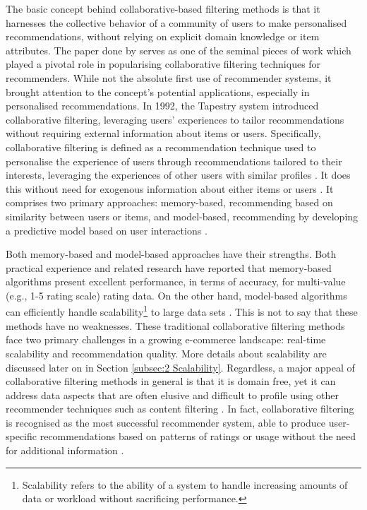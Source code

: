The basic concept behind collaborative-based filtering methods is that it harnesses the collective behavior of a community of users to make personalised recommendations, without relying on explicit domain knowledge or item attributes. The paper done by \cite{resnick1994grouplens} serves as one of the seminal pieces of work which played a pivotal role in popularising collaborative filtering techniques for recommenders. While not the absolute first use of recommender systems, it brought attention to the concept's potential applications, especially in personalised recommendations. In 1992, the Tapestry system \cite{goldberg1992using} introduced collaborative filtering, leveraging users' experiences to tailor recommendations without requiring external information about items or users. Specifically, collaborative filtering is defined as a recommendation technique used to personalise the experience of users through recommendations tailored to their interests, leveraging the experiences of other users with similar profiles \cite{herlocker1999algorithmic}. It does this without need for exogenous information about either items or users \cite{shapira2022recommender}. It comprises two primary approaches: memory-based, recommending based on similarity between users or items, and model-based, recommending by developing a predictive model based on user interactions \cite{symeonidis2008collaborative}. 

Both memory-based and model-based approaches have their strengths. Both practical experience and related research have reported that memory-based algorithms present excellent performance, in terms of accuracy, for multi-value (e.g., 1-5 rating scale) rating data. On the other hand, model-based algorithms can efficiently handle scalability\footnote{Scalability refers to the ability of a system to handle increasing amounts of data or workload without sacrificing performance.} to large data sets \cite{symeonidis2008collaborative}. This is not to say that these methods have no weaknesses. These traditional collaborative filtering methods face two primary challenges in a growing e-commerce landscape: real-time scalability and recommendation quality. More details about scalability are discussed later on in Section \ref{subsec:2 Scalability}. Regardless, a major appeal of collaborative filtering methods in general is that it is domain free, yet it can address data aspects that are often elusive and difficult to profile using other recommender techniques such as content filtering \cite{koren2009matrix}. In fact, collaborative filtering is recognised as the most successful recommender system, able to produce user-specific recommendations based on patterns of ratings or usage without the need for additional information \cite{koren2009matrix}. 


